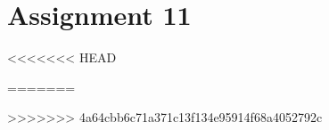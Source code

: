 \documentclass[12pt,a4paper,ngerman]{exam}
\begin{document}
\section*{Assignment 11}
\begin{questions}

<<<<<<< HEAD





=======
    
    
    
    
    
>>>>>>> 4a64cbb6c71a371c13f134e95914f68a4052792c

\end{questions}
\end{document}
